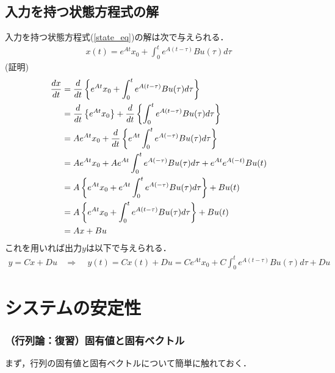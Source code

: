 \subsection{入力を持つ状態方程式の解}

入力を持つ状態方程式(\ref{state_eq})の解は次で与えられる．
\begin{align}
	x(t) = e^{At} x_0 + \int_0^t e^{A(t-\tau)} B u (\tau) d \tau
\label{response_w_input}
\end{align}
(証明)
\begin{align}
	{dx \over dt} 
	&= {d \over dt} \left\{ e^{At} x_0 + \int_0^t e^{A(t-\tau)} B u (\tau) d \tau \right\}
\nonumber \\
	&= {d \over dt} \left\{ e^{At} x_0 \right\}
		+ {d \over dt} \left\{ \int_0^t e^{A(t-\tau)} B u (\tau) d \tau \right\}
\nonumber\\
	&= A e^{At} x_0 +  {d \over dt} \left\{ e^{At} \int_0^t e^{A(-\tau)} B u (\tau) d \tau \right\}
\nonumber\\
	&= A e^{At} x_0 +  A e^{At} \int_0^t e^{A(-\tau)} B u (\tau) d \tau
	      + e^{At}  e^{A(-t)} B u (t)
\nonumber\\
	&= A \left\{ e^{At} x_0 +  e^{At} \int_0^t e^{A(-\tau)} B u (\tau) d \tau \right\}
	      +  B u (t)
\nonumber \\
	&= A \left\{ e^{At} x_0 +  \int_0^t e^{A(t-\tau)} B u (\tau) d \tau \right\}
	      +  B u (t)
\nonumber\\
	& = Ax + Bu
\end{align}
これを用いれば出力$y$は以下で与えられる．
\begin{align}
	y = Cx + Du \ \ \ \ \Rightarrow \ \ \ \ \ y(t)= Cx(t)+Du = Ce^{At} x_0 + C\int_0^t e^{A(t-\tau)} B u (\tau) d \tau + Du
\label{eq:outputresponse}
\end{align}



\section{システムの安定性}

\subsubsection{（行列論：復習）固有値と固有ベクトル}

まず，行列の固有値と固有ベクトルについて簡単に触れておく．

